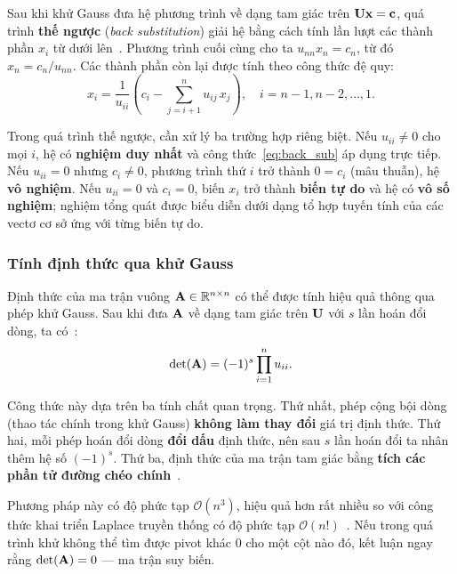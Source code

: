 Sau khi khử Gauss đưa hệ phương trình về dạng tam giác trên $\mathbf{U}\mathbf{x} = \mathbf{c}$, quá trình \textbf{thế ngược} (\textit{back substitution}) giải hệ bằng cách tính lần lượt các thành phần $x_i$ từ dưới lên~\cite{golub2013}. Phương trình cuối cùng cho ta $u_{nn}x_n = c_n$, từ đó $x_n = c_n/u_{nn}$. Các thành phần còn lại được tính theo công thức đệ quy:
\begin{equation}
    x_i = \frac{1}{u_{ii}}\left(c_i - \sum_{j=i+1}^{n} u_{ij}\,x_j\right), \quad i = n-1, n-2, \ldots, 1.
    \label{eq:back_sub}
\end{equation}

Trong quá trình thế ngược, cần xử lý ba trường hợp riêng biệt. Nếu $u_{ii} \neq 0$ cho mọi $i$, hệ có \textbf{nghiệm duy nhất} và công thức~\eqref{eq:back_sub} áp dụng trực tiếp. Nếu $u_{ii} = 0$ nhưng $c_i \neq 0$, phương trình thứ $i$ trở thành $0 = c_i$ (mâu thuẫn), hệ \textbf{vô nghiệm}. Nếu $u_{ii} = 0$ và $c_i = 0$, biến $x_i$ trở thành \textbf{biến tự do} và hệ có \textbf{vô số nghiệm}; nghiệm tổng quát được biểu diễn dưới dạng tổ hợp tuyến tính của các vectơ cơ sở ứng với từng biến tự do.

\subsubsection{Tính định thức qua khử Gauss}

Định thức của ma trận vuông $\mathbf{A} \in \mathbb{R}^{n \times n}$ có thể được tính hiệu quả thông qua phép khử Gauss. Sau khi đưa $\mathbf{A}$ về dạng tam giác trên $\mathbf{U}$ với $s$ lần hoán đổi dòng, ta có~\cite{strang2023}:
\begin{equation}
    \det(\mathbf{A}) = (-1)^s \prod_{i=1}^{n} u_{ii}.
    \label{eq:det}
\end{equation}

Công thức này dựa trên ba tính chất quan trọng. Thứ nhất, phép cộng bội dòng (thao tác chính trong khử Gauss) \textbf{không làm thay đổi} giá trị định thức. Thứ hai, mỗi phép hoán đổi dòng \textbf{đổi dấu} định thức, nên sau $s$ lần hoán đổi ta nhân thêm hệ số $(-1)^s$. Thứ ba, định thức của ma trận tam giác bằng \textbf{tích các phần tử đường chéo chính}~\cite{golub2013}.

Phương pháp này có độ phức tạp $\mathcal{O}(n^3)$, hiệu quả hơn rất nhiều so với công thức khai triển Laplace truyền thống có độ phức tạp $\mathcal{O}(n!)$~\cite{strang2023}. Nếu trong quá trình khử không thể tìm được pivot khác $0$ cho một cột nào đó, kết luận ngay rằng $\det(\mathbf{A}) = 0$ --- ma trận suy biến.

